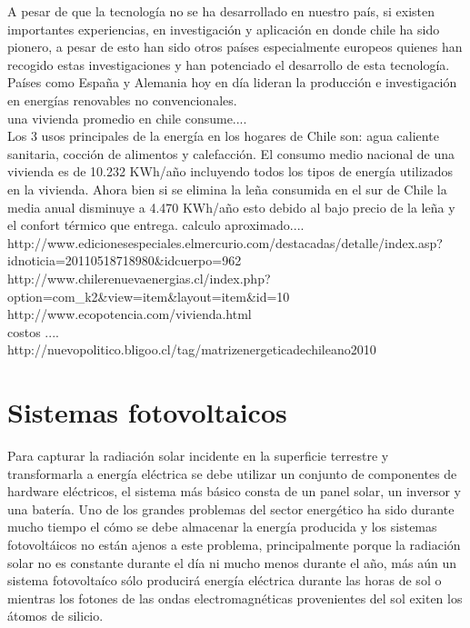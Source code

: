 A pesar de que la tecnología no se ha desarrollado en nuestro país, si existen importantes experiencias, en investigación y aplicación en donde chile ha sido pionero\cite{colegioIng:2}, a pesar de esto han sido otros países especialmente europeos quienes han recogido estas investigaciones y han potenciado el desarrollo de esta tecnología. Países como España y Alemania hoy en día lideran la producción e investigación en energías renovables no convencionales.\\

	una vivienda promedio en chile consume....\\

Los 3 usos principales de la energía en los hogares de Chile son: agua caliente sanitaria, cocción de alimentos y calefacción. El consumo medio nacional de una vivienda es de 10.232 KWh/año incluyendo todos los tipos de energía utilizados en la vivienda. Ahora bien si se elimina la leña consumida en el sur de Chile la media anual disminuye a 4.470 KWh/año esto debido al bajo precio de la leña y el confort térmico que entrega.
calculo aproximado....\\

http://www.edicionesespeciales.elmercurio.com/destacadas/detalle/index.asp?idnoticia=20110518718980\&idcuerpo=962\\
http://www.chilerenuevaenergias.cl/index.php?option=com\_k2\&view=item\&layout=item\&id=10\\
http://www.ecopotencia.com/vivienda.html\\

costos ....\\
http://nuevopolitico.bligoo.cl/tag/matrizenergeticadechileano2010\\

\section{Sistemas fotovoltaicos}
Para capturar la radiación solar incidente en la superficie terrestre y transformarla a energía eléctrica se debe utilizar un conjunto de componentes de hardware eléctricos, el sistema más básico consta de un panel solar, un inversor y una batería. Uno de los grandes problemas del sector energético ha sido durante mucho tiempo el cómo se debe almacenar la energía producida y los sistemas fotovoltáicos no están ajenos a este problema, principalmente porque la radiación solar no es constante durante el día ni mucho menos durante el año, más aún un sistema fotovoltaíco sólo producirá energía eléctrica durante las horas de sol o mientras los fotones de las ondas electromagnéticas provenientes del sol exiten los átomos de silicio.

